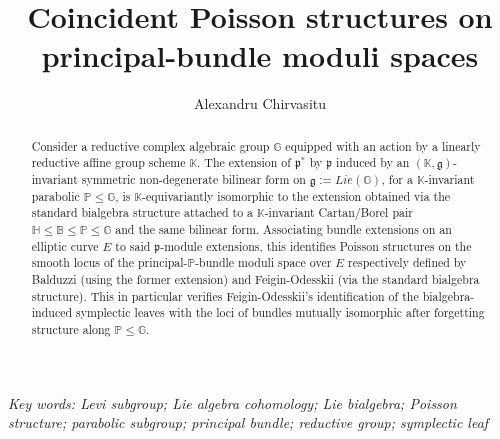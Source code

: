 \documentclass[11pt,leqno]{article}
\title{Coincident Poisson structures on principal-bundle moduli spaces}
\author{Alexandru Chirvasitu}
\theoremstyle{plain}
\theoremstyle{plain}
\theoremstyle{plain}
\numberwithin{equation}{section}
\theoremstyle{nonumberplain}
\newcommand\1{{\bf 1}}
\begin{document}
\date{}


\newcommand{\Addresses}{{%
  \bigskip
  \footnotesize

  \textsc{Department of Mathematics, University at Buffalo}
  \par\nopagebreak
  \textsc{Buffalo, NY 14260-2900, USA}  
  \par\nopagebreak
  \textit{E-mail address}: \texttt{achirvas@buffalo.edu}


}}


\maketitle

\begin{abstract}
  Consider a reductive complex algebraic group $\mathbb{G}$ equipped with an action by a linearly reductive affine group scheme $\mathbb{K}$. The extension of $\mathfrak{p}^*$ by $\mathfrak{p}$ induced by an $(\mathbb{K},\mathfrak{g})$-invariant symmetric non-degenerate bilinear form on $\mathfrak{g}:=Lie(\mathbb{G})$, for a $\mathbb{K}$-invariant parabolic $\mathbb{P}\le \mathbb{G}$, is $\mathbb{K}$-equivariantly isomorphic to the extension obtained via the standard bialgebra structure attached to a $\mathbb{K}$-invariant Cartan/Borel pair $\mathbb{H}\le \mathbb{B}\le \mathbb{P}\le \mathbb{G}$ and the same bilinear form. Associating bundle extensions on an elliptic curve $E$ to said $\mathfrak{p}$-module extensions, this identifies Poisson structures on the smooth locus of the principal-$\mathbb{P}$-bundle moduli space over $E$ respectively defined by Balduzzi (using the former extension) and Feigin-Odesskii (via the standard bialgebra structure). This in particular verifies Feigin-Odesskii's identification of the bialgebra-induced symplectic leaves with the loci of bundles mutually isomorphic after forgetting structure along $\mathbb{P}\le \mathbb{G}$.
\end{abstract}

\noindent \emph{Key words:
  Levi subgroup;
  Lie algebra cohomology;
  Lie bialgebra;
  Poisson structure;
  parabolic subgroup;
  principal bundle;
  reductive group;
  symplectic leaf
}


\vspace{.5cm}


\end{document}
